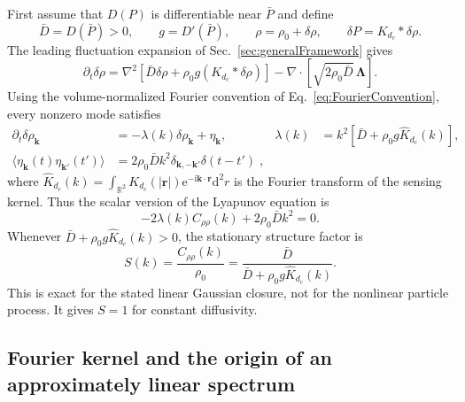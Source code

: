 \documentclass{article}
\begin{document}
First assume that $D(P)$ is differentiable near $\bar P$ and define
\begin{equation}
    \bar D=D(\bar P)>0,\qquad g=D'(\bar P),\qquad
    \rho=\rho_0+\delta\rho,\qquad \delta P=K_{d_c}*\delta\rho.
\end{equation}
The leading fluctuation expansion of Sec.~\ref{sec:generalFramework} gives
\begin{equation}
    \partial_t\delta\rho=\nabla^2[\bar D\delta\rho+\rho_0g(K_{d_c}*\delta\rho)]
    -\nabla\cdot[\sqrt{2\rho_0\bar D}\,\boldsymbol\Lambda].
    \label{eq:ffLinearSPDE}
\end{equation}
Using the volume-normalized Fourier convention of Eq.~\eqref{eq:FourierConvention}, every nonzero mode satisfies
\begin{align}
    \partial_t\delta\rho_{\mathbf k}&=-\lambda(k)\delta\rho_{\mathbf k}+\eta_{\mathbf k},
    &\lambda(k)&=k^2[\bar D+\rho_0g\widehat K_{d_c}(k)],\\
    \langle\eta_{\mathbf k}(t)\eta_{\mathbf k'}(t')\rangle
    &=2\rho_0\bar D k^2\delta_{\mathbf k,-\mathbf k'}\delta(t-t')\;,
    \label{eq:ffOU}
\end{align}
where $\widehat{K}_{d_c}(k)=\int_{\mathbb{R} ^2}{K_{d_c}\left( \left| \mathbf{r} \right| \right) \mathrm{e}^{-\mathrm{i}\mathbf{k}\cdot \mathbf{r}}\mathrm{d}^2r}$ is the Fourier transform of the sensing kernel. 
Thus the scalar version of the Lyapunov equation is
\begin{equation}
    -2\lambda(k)C_{\rho\rho}(k)+2\rho_0\bar Dk^2=0.
\end{equation}
Whenever $\bar D+\rho_0g\widehat K_{d_c}(k)>0$, the stationary structure factor is
\begin{equation}
    \boxed{S(k)=\frac{C_{\rho\rho}(k)}{\rho_0}
    =\frac{\bar D}{\bar D+\rho_0g\widehat K_{d_c}(k)}.}
    \label{eq:ffSk}
\end{equation}
This is exact for the stated linear Gaussian closure, not for the nonlinear particle process. It gives $S=1$ for constant diffusivity.

\subsection{Fourier kernel and the origin of an approximately linear spectrum}
\end{document}
